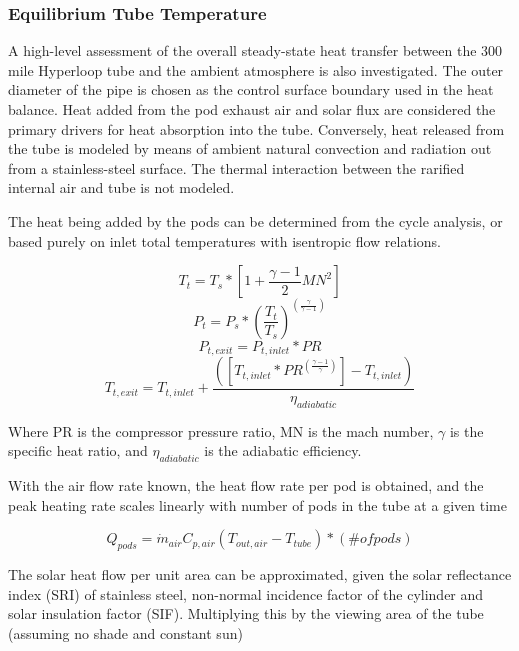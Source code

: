 \documentclass[heading.tex]{subfiles}
\begin{document}
\subsubsection{Equilibrium Tube Temperature}
A high-level assessment of the overall steady-state heat transfer between the 300 mile Hyperloop tube and the ambient atmosphere is
also investigated. The outer diameter of the pipe is chosen as the control surface boundary used in the heat balance. Heat added from the pod exhaust
air and solar flux are considered the primary drivers for heat absorption into the tube. Conversely, heat released from the tube is modeled by means of
ambient natural convection and radiation out from a stainless-steel surface. The thermal interaction between the rarified internal air and
tube is not modeled.

The heat being added by the pods can be determined from the cycle analysis, or based purely on inlet total temperatures with isentropic
flow relations.

\begin{equation}
T_{t} = T_{s} * [1 + \frac{\gamma -1}{2} MN^2]
\end{equation}
\begin{equation}
P_{t} = P_{s} * (\frac{ T_{t}}{T_{s}})^(\frac{\gamma}{\gamma -1})
\end{equation}
\begin{equation}
P_{t,exit} = P_{t,inlet} * PR
\end{equation}
\begin{equation}
T_{t,exit} = T_{t,inlet} + \frac{([T_{t,inlet}*PR^{(\frac{\gamma-1}{\gamma})}] - T_{t,inlet})}  {{\eta}_{adiabatic}}
\end{equation}

Where PR is the compressor pressure ratio, MN is the mach number,  $\gamma$ is the specific heat ratio, and  ${\eta}_{adiabatic}$ is the
adiabatic efficiency.

With the air flow rate known, the heat flow rate per pod is obtained, 
and the peak heating rate scales linearly with number of pods in the tube at a given time

\begin{equation}
{Q}_{pods}= \dot{m}_{air} C_{p,air} (T_{out, air} - T_{tube}) * (\#  of pods)
\end{equation}

The solar heat flow per unit area can be approximated, given the solar reflectance index (SRI) of stainless steel, non-normal incidence factor
of the cylinder and solar insulation factor (SIF).
Multiplying this by the viewing area of the tube (assuming no shade and constant sun)
\end{document}
